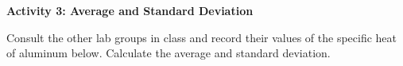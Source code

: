 




\textbf{Activity 3: Average and Standard Deviation}

Consult the other lab groups in class and record their values of the specific
heat of aluminum below. Calculate the average and standard deviation.
\vspace{2in}







